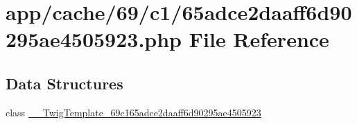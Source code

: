 \hypertarget{65adce2daaff6d90295ae4505923_8php}{\section{app/cache/69/c1/65adce2daaff6d90295ae4505923.php File Reference}
\label{65adce2daaff6d90295ae4505923_8php}
}
\subsection*{Data Structures}
\begin{DoxyCompactItemize}
\item 
class \hyperlink{class_____twig_template__69c165adce2daaff6d90295ae4505923}{\-\_\-\-\_\-\-Twig\-Template\-\_\-69c165adce2daaff6d90295ae4505923}
\end{DoxyCompactItemize}
